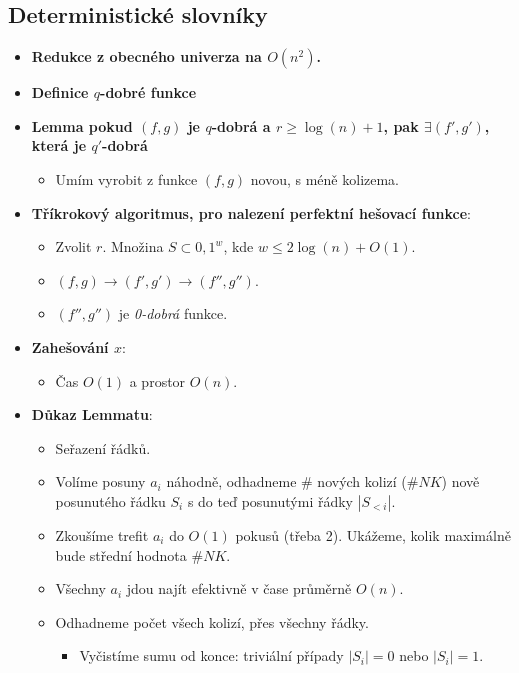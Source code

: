 \documentclass[11pt,a4paper]{article}
\begin{document}
\subsection{Deterministické slovníky}
\begin{itemize}
    \item \textbf{Redukce z obecného univerza na $ O(n^2) $.}
    \item \textbf{Definice $q$-dobré funkce}
    \item \textbf{Lemma pokud $(f,g)$ je $q$-dobrá a $r \geq \log(n) + 1$, pak $ \exists (f', g') $, která je $q'$-dobrá}
    \begin{itemize}
        \item Umím vyrobit z funkce $(f,g)$ novou, s méně kolizema.
    \end{itemize}
    \item \textbf{Tříkrokový algoritmus, pro nalezení perfektní hešovací funkce}:
    \begin{itemize}
        \item Zvolit $r$. Množina $S \subset {0,1}^w$, kde $w \leq 2\log(n) + O(1)$.
        \item $(f,g) \rightarrow (f',g') \rightarrow (f'',g'')$.
        \item $(f'', g'')$ je \textit{0-dobrá} funkce.
    \end{itemize}
    \item \textbf{Zahešování $x$}:
    \begin{itemize}
        \item Čas $O(1)$ a prostor $O(n)$.
    \end{itemize}
    \item \textbf{Důkaz Lemmatu}:
    \begin{itemize}
        \item Seřazení řádků.
        \item Volíme posuny $a_i$ náhodně, odhadneme $\#$ nových kolizí ($\#NK$) nově posunutého řádku $S_i$ s do teď posunutými řádky $|S_{<i}|$.
        \item Zkoušíme trefit $a_i$ do $O(1)$ pokusů (třeba 2). Ukážeme, kolik maximálně bude střední hodnota $\#NK$. 
        \item Všechny $a_i$ jdou najít efektivně v čase průměrně $O(n)$.
        \item Odhadneme počet všech kolizí, přes všechny řádky.
        \begin{itemize}
            \item Vyčistíme sumu od konce: triviální případy $|S_i| = 0$ nebo $|S_i| =1$.

\end{itemize}
\end{itemize}
\end{itemize}
\end{document}
